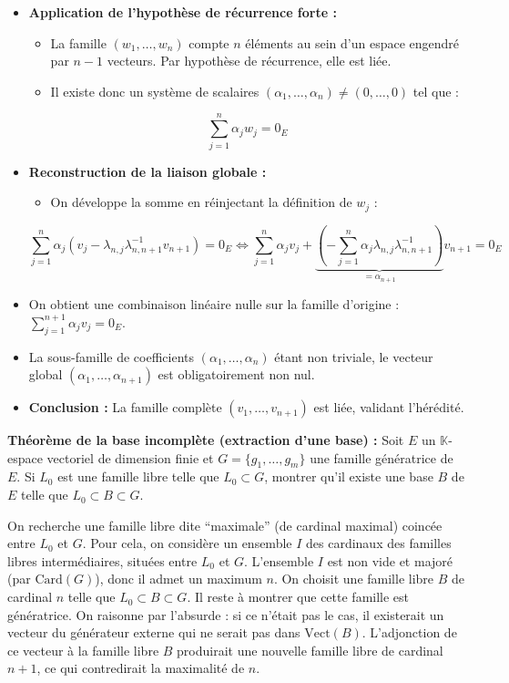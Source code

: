 \documentclass[11pt, a4paper]{article}
\theoremstyle{definition}
\begin{document}
\begin{itemize}
\begin{itemize}
\end{itemize}
\item \textbf{Application de l'hypothèse de récurrence forte :}
\begin{itemize}
\item La famille $(w_1, \dots, w_n)$ compte $n$ éléments au sein d'un espace engendré par $n-1$ vecteurs. Par hypothèse de récurrence, elle est liée.
\item Il existe donc un système de scalaires $(\alpha_1, \dots, \alpha_n) \neq (0, \dots, 0)$ tel que :
\end{itemize}
\[
\sum_{j=1}^n \alpha_j w_j = 0_E
\]
\item \textbf{Reconstruction de la liaison globale :}
\begin{itemize}
\item On développe la somme en réinjectant la définition de $w_j$ :
\end{itemize}
\[
\sum_{j=1}^n \alpha_j \left( v_j - \lambda_{n,j} \lambda_{n,n+1}^{-1} v_{n+1} \right) = 0_E \iff \sum_{j=1}^n \alpha_j v_j + \underbrace{\left( - \sum_{j=1}^n \alpha_j \lambda_{n,j} \lambda_{n,n+1}^{-1} \right)}_{= \alpha_{n+1}} v_{n+1} = 0_E
\]
\item On obtient une combinaison linéaire nulle sur la famille d'origine : $\sum_{j=1}^{n+1} \alpha_j v_j = 0_E$.
\item La sous-famille de coefficients $(\alpha_1, \dots, \alpha_n)$ étant non triviale, le vecteur global $(\alpha_1, \dots, \alpha_{n+1})$ est obligatoirement non nul.
\item \textbf{Conclusion :} La famille complète $(v_1, \dots, v_{n+1})$ est liée, validant l'hérédité.
\end{itemize}

\clearpage

\begin{tcolorbox}[instructionstyle]

\textbf{Théorème de la base incomplète (extraction d'une base) :} Soit $E$ un $\mathbb{K}$-espace vectoriel de dimension finie et $G = \{g_1, \dots, g_m\}$ une famille génératrice de $E$. Si $L_0$ est une famille libre telle que $L_0 \subset G$, montrer qu'il existe une base $B$ de $E$ telle que $L_0 \subset B \subset G$.
\end{tcolorbox}

\begin{tcolorbox}[methodstyle]
	On recherche une famille libre dite ``maximale'' (de cardinal maximal) coincée entre $L_0$ et $G$. Pour cela, on considère un ensemble $I$ des cardinaux des familles libres intermédiaires, situées entre $L_0$ et $G$. L'ensemble $I$ est non vide et majoré (par $\mathrm{Card}(G)$), donc il admet un maximum $n$. On choisit une famille libre $B$ de cardinal $n$ telle que $L_0 \subset B \subset G$. Il reste à montrer que cette famille est génératrice. On raisonne par l'absurde : si ce n'était pas le cas, il existerait un vecteur du générateur externe qui ne serait pas dans $\mathrm{Vect}(B)$. L'adjonction de ce vecteur à la famille libre $B$ produirait une nouvelle famille libre de cardinal $n+1$, ce qui contredirait la maximalité de $n$.
\end{tcolorbox}
\end{document}
